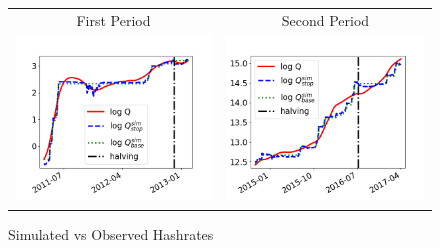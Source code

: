 \documentclass[12pt, a4paper]{article}
\begin{document}
\begin{figure}[]
\caption{Simulated vs Observed Hashrates}
\label{fig:hashrate_variable_costs}\centering
\begin{tabular}{cc}
First Period & Second Period \\
\includegraphics[scale=0.54]{images/Q_Q_sim_stop1.png} & %
\includegraphics[scale=0.54]{images/Q_Q_sim_stop2.png}%
\end{tabular}%
\end{figure}
\end{document}
